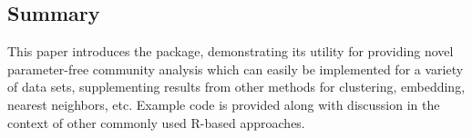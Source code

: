 \hypertarget{summary}{%
\subsection{Summary}\label{summary}}

This paper introduces the  package, demonstrating its
utility for providing novel parameter-free community analysis which can
easily be implemented for a variety of data sets, supplementing results
from other methods for clustering, embedding, nearest neighbors, etc.
Example code is provided along with discussion in the context of other
commonly used R-based approaches.




\address{%
Lucy D'Agostino McGowan\\
Wake Forest University\\%
Winston-Salem, NC\\ 27106\\
%
%
%
\href{mailto:mcgowald@wfu.edu}{\nolinkurl{mcgowald@wfu.edu}}%
}

\address{%
Katherine Moore\\
Amherst College\\%
Amherst, MA\\ 1002\\
%
%
%
\href{mailto:kmoore@amherst.edu}{\nolinkurl{kmoore@amherst.edu}}%
}

\address{%
Kenneth Berenhaut\\
Wake Forest University\\%
Winston-Salem, NC\\ 27106\\
%
%
%
\href{mailto:berenhks@wfu.edu}{\nolinkurl{berenhks@wfu.edu}}%
}
